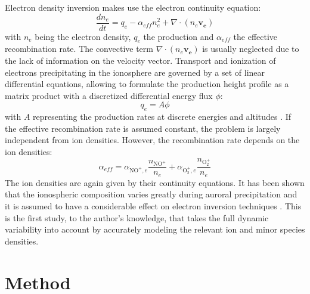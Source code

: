 \documentclass[10pt, a4paper]{article}
\numberwithin{equation}{section}										%
\begin{document}
Electron density inversion makes use the electron continuity equation:
\begin{equation}
	\frac{dn_e}{dt} = q_e - \alpha_{eff} n_e^2 + \nabla \cdot (n_e \bm{v_{e}})
\end{equation}
with $n_e$ being the electron density, $q_e$ the production and $\alpha_{eff}$ the effective recombination rate. The convective term $\nabla \cdot (n_e \bm{v_e})$ is usually neglected due to the lack of information on the velocity vector.
Transport and ionization of electrons precipitating in the ionosphere are governed by a set of linear differential equations, allowing to formulate the production height profile as a matrix product with a discretized differential energy flux $\phi$:
\begin{equation}
	q_e = A \phi
\end{equation}
with $A$ representing the production rates at discrete energies and altitudes \cite{fang_parameterization_2010, semeter_determination_2005}. %
If the effective recombination rate is assumed constant, the problem is largely independent from ion densities. However, the recombination rate depends on the ion densities:
\begin{equation}
	\alpha_{eff} = \alpha_{\mathrm{NO^+}, e} \frac{n_{\mathrm{NO^+}}}{n_e} + \alpha_{\mathrm{O_2^+}, e} \frac{n_{\mathrm{O_2^+}}}{n_e}
\end{equation}
The ion densities are again given by their continuity equations. It has been shown that the ionospheric composition varies greatly during auroral precipitation \cite{jones_time_1973} and it is assumed to have a considerable effect on electron inversion techniques \cite{virtanen_electron_2018}. This is the first study, to the author's knowledge, that takes the full dynamic variability into account by accurately modeling the relevant ion and minor species densities.

\section{Method}
\end{document}
